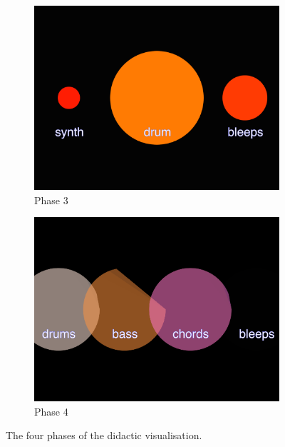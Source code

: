 \begin{figure}
\begin{subfigure}{.5\textwidth}
  \includegraphics[width=.95\linewidth]{../study-2/results/visualisations/didactic-three.png}
  \caption{Phase 3}
  \label{fig:didactic-three}
\end{subfigure}%
\begin{subfigure}{.5\textwidth}
  \includegraphics[width=.95\linewidth]{../study-2/results/visualisations/didactic-four.png}
  \caption{Phase 4}
  \label{fig:didactic-four}
\end{subfigure}

\caption[Didactic visualisation phases]{The four phases of the didactic visualisation.}
\label{fig:didactic-visualisations}
\end{figure}
